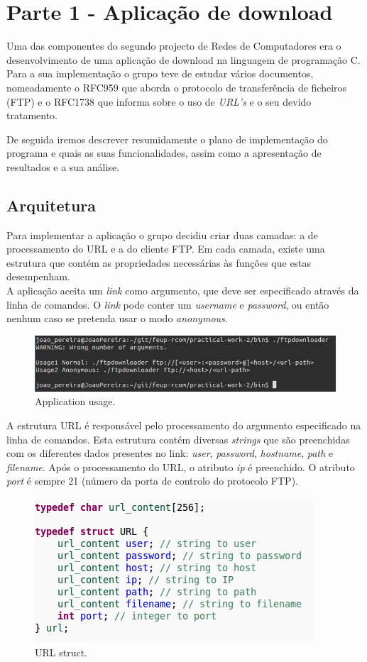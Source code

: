 \documentclass[a4paper]{article}
\begin{document}
\section{Parte 1 - Aplicação de download}
Uma das componentes do segundo projecto de Redes de Computadores era o desenvolvimento de uma aplicação de download na linguagem de programação C. Para a sua implementação o grupo teve de estudar vários documentos, nomeadamente o RFC959 que aborda o protocolo de transferência de ficheiros (FTP)  e o RFC1738 que informa sobre o uso de \textit{URL's} e o seu devido tratamento.

De seguida iremos descrever resumidamente o plano de implementação do programa e quais as suas funcionalidades, assim como a apresentação de resultados e a sua análise.

\subsection{Arquitetura}
Para implementar a aplicação o grupo decidiu criar duas camadas: a de processamento do URL e a do cliente FTP.
Em cada camada, existe uma estrutura que contém as propriedades necessárias às funções que estas desempenham.\\
A aplicação aceita um \textit{link} como argumento, que deve ser especificado através da linha de comandos. O \textit{link} pode conter um \textit{username} e \textit{password}, ou então nenhum caso se pretenda usar o modo \textit{anonymous}.

\begin{figure}[h!]
\includegraphics[scale=0.5]{res/usage.png}
\caption{Application usage.}
\end{figure}

A estrutura URL é responsável pelo processamento do argumento especificado na linha de comandos. Esta estrutura contém diversas \textit{strings} que são preenchidas com os diferentes dados presentes no link: \textit{user}, \textit{password}, \textit{hostname}, \textit{path} e \textit{filename}. Após o processamento do URL, o atributo \textit{ip} é preenchido. O atributo \textit{port} é sempre 21 (número da porta de controlo do protocolo FTP).

\begin{figure}[h!]
\centering
\includegraphics[scale=0.5]{res/url-struct.png}
\caption{URL struct.}
\end{figure}
\end{document}
